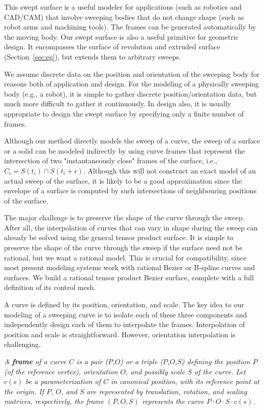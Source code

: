 This swept surface is a useful modeler for applications (such as
robotics and CAD/CAM) that involve sweeping bodies that do not change shape 
(such as robot arms and machining tools).
The frames can be generated automatically by the moving body.
Our swept surface is also a useful primitive for geometric design.
It encompasses the surface of revolution and extruded surface
(Section~\ref{sec:eg}), but extends them to arbitrary sweeps.

We assume discrete data on the position and orientation
of the sweeping body for reasons both of application and design.
For the modeling of a physically sweeping body (e.g., a robot), 
it is simple to gather discrete position/orientation data, 
but much more difficult to gather it continuously.
In design also, it is usually appropriate to design the swept surface
by specifying only a finite number of frames.

Although our method directly models the sweep of a curve,
the sweep of a surface or a solid can be modeled indirectly
by using curve frames that represent the intersection of two 
"instantaneously close" frames of the surface,
i.e., $C_i = S(t_i) \cap S(t_i+\epsilon)$.
Although this will not construct an 
exact model of an actual sweep of the surface,
it is likely to be a good approximation since the 
envelope of a surface is computed by such intersections
of neighbouring positions of the surface.

The major challenge is to preserve the shape of the curve through the sweep.
After all, the interpolation of curves that can vary in shape during the sweep
can already be solved using the general tensor product surface.
It is simple to preserve the shape of the curve through the sweep
if the surface need not be rational, but we want a rational model.
This is crucial for compatibility, 
since most present modeling systems work with rational Bezier or
B-spline curves and surfaces.
We build a rational tensor product Bezier surface, complete with a full
definition of its control mesh.

A curve is defined by its position, orientation, and scale.
The key idea to our modeling of a sweeping curve is to isolate each
of these three components and independently design each of them 
to interpolate the frames.
Interpolation of position and scale is straightforward.
However, orientation interpolation is challenging.

\begin{defn2}
{\em
A {\bf frame} of a curve $C$ is a pair ($P$,$O$) or a triple 
($P$,$O$,$S$)
defining the position $P$ (of the reference vertex), 
orientation $O$, and possibly scale $S$ of the curve.
Let $c(s)$ be a parameterization of $C$ in canonical position,
with its reference point at the origin.
If $P$, $O$, and $S$ are represented by translation, rotation, and scaling 
matrices, respectively, the frame $(P,O,S)$ represents the curve 
$P \cdot O \cdot S \cdot c(s)$.
}
\end{defn2}

